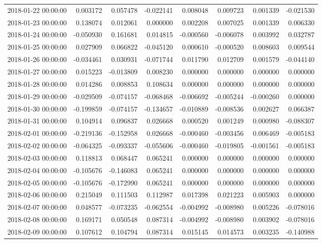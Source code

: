 \begin{tabular}{lrrrrrrr}
2018-01-22 00:00:00 & 0.003172 & 0.057478 & -0.022141 & 0.008048 & 0.009723 & 0.001339 & -0.021530 \\
2018-01-23 00:00:00 & 0.138074 & 0.012061 & 0.000000 & 0.002208 & 0.007025 & 0.001339 & 0.006330 \\
2018-01-24 00:00:00 & -0.050930 & 0.161681 & 0.014815 & -0.000560 & -0.006078 & 0.003992 & 0.032787 \\
2018-01-25 00:00:00 & 0.027909 & 0.066822 & -0.045120 & 0.000610 & -0.000520 & 0.008603 & 0.009544 \\
2018-01-26 00:00:00 & -0.034461 & 0.030931 & -0.071744 & 0.011790 & 0.012709 & 0.001579 & -0.044140 \\
2018-01-27 00:00:00 & 0.015223 & -0.013809 & 0.008230 & 0.000000 & 0.000000 & 0.000000 & 0.000000 \\
2018-01-28 00:00:00 & 0.014286 & 0.008853 & 0.108634 & 0.000000 & 0.000000 & 0.000000 & 0.000000 \\
2018-01-29 00:00:00 & -0.029509 & -0.074157 & -0.068468 & -0.006692 & -0.005244 & -0.000260 & 0.000000 \\
2018-01-30 00:00:00 & -0.199859 & -0.074157 & -0.134657 & -0.010889 & -0.008536 & 0.002627 & 0.066387 \\
2018-01-31 00:00:00 & 0.104914 & 0.096837 & 0.026668 & 0.000520 & 0.001249 & 0.000980 & -0.088307 \\
2018-02-01 00:00:00 & -0.219136 & -0.152958 & 0.026668 & -0.000460 & -0.003456 & 0.006469 & -0.005183 \\
2018-02-02 00:00:00 & -0.064325 & -0.093337 & -0.055606 & -0.000460 & -0.019805 & -0.001561 & -0.005183 \\
2018-02-03 00:00:00 & 0.118813 & 0.068447 & 0.065241 & 0.000000 & 0.000000 & 0.000000 & 0.000000 \\
2018-02-04 00:00:00 & -0.105676 & -0.146083 & 0.065241 & 0.000000 & 0.000000 & 0.000000 & 0.000000 \\
2018-02-05 00:00:00 & -0.105676 & -0.172990 & 0.065241 & 0.000000 & 0.000000 & 0.000000 & 0.000000 \\
2018-02-06 00:00:00 & 0.215049 & 0.111503 & 0.112987 & 0.017398 & 0.021223 & 0.005903 & 0.000000 \\
2018-02-07 00:00:00 & 0.048577 & -0.073235 & -0.062554 & -0.004992 & -0.008980 & 0.005226 & -0.078016 \\
2018-02-08 00:00:00 & 0.169171 & 0.050548 & 0.087314 & -0.004992 & -0.008980 & 0.003902 & -0.078016 \\
2018-02-09 00:00:00 & 0.107612 & 0.104794 & 0.087314 & 0.015145 & 0.014573 & 0.003235 & -0.140988 \\

\end{tabular}
